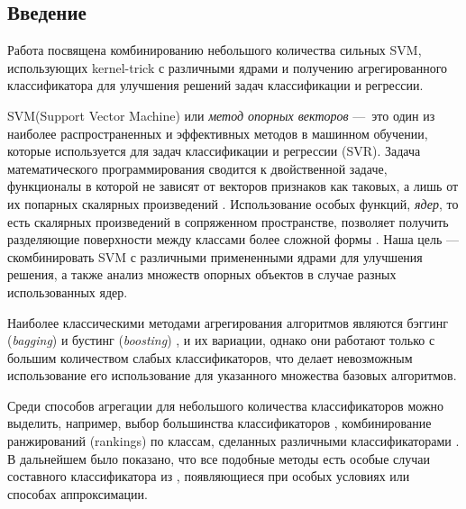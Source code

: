 \documentclass[a4paper, 10pt]{article}
\begin{document}
    \begin{multicols}{2}

\section*{Введение}
	
	Работа посвящена комбинированию небольшого количества сильных SVM, использующих kernel-trick с различными ядрами и получению агрегированного классификатора для улучшения решений задач классификации и регрессии. 
	
	
	SVM(Support Vector Machine) или \emph{метод опорных векторов}\cite{Vapnik1998}\cite{Cortes1995} \cite{Boser1992} ---~это один из наиболее распространенных и эффективных методов в машинном обучении, которые используется для задач классификации и регрессии (SVR). Задача математического программирования сводится к двойственной задаче, функционалы в которой не зависят от векторов признаков как таковых, а лишь от их попарных скалярных произведений \cite{Voron} . Использование особых функций, \emph{ядер}, то есть скалярных произведений в сопряженном пространстве, позволяет получить разделяющие поверхности между классами более сложной формы \cite{Smola2004}. Наша цель --- скомбинировать SVM
	с различными примененными ядрами для улучшения решения, а также анализ множеств опорных объектов в случае разных использованных ядер.
	
	
	Наиболее классическими методами агрегирования алгоритмов являются 
	бэггинг (\emph{bagging})\cite{Breiman1996} и бустинг (\emph{boosting}) \cite{Freund1995}, и их
	вариации, однако они работают только с  большим количеством слабых классификаторов, что делает невозможным использование его использование для указанного множества базовых алгоритмов.
	
	Среди способов агрегации для небольшого количества классификаторов можно
	выделить, например, выбор большинства классификаторов \cite{Franke1992}, 
	комбинирование ранжирований (rankings) по классам, сделанных различными
	классификаторами \cite{Ho1994}. В дальнейшем было показано, что все подобные 
	методы есть особые случаи составного классификатора из \cite{Kittler1996}, 
	появляющиеся при особых условиях или способах аппроксимации.
	

\end{multicols}
\end{document}
